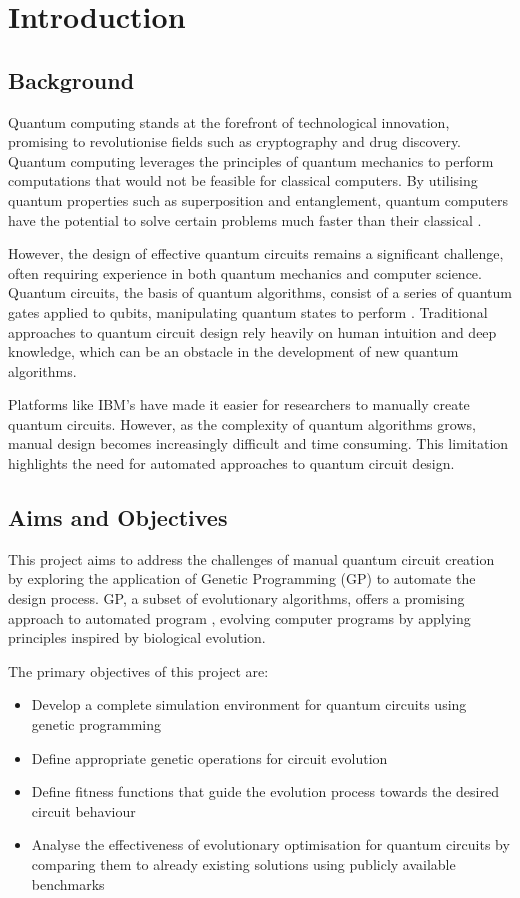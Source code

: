 \chapter{Introduction}
\section{Background}

Quantum computing stands at the forefront of technological innovation, promising to revolutionise fields such as cryptography and drug discovery. Quantum computing leverages the principles of quantum mechanics to perform computations that would not be feasible for classical computers. By utilising quantum properties such as superposition and entanglement, quantum computers have the potential to solve certain problems much faster than their classical .

However, the design of effective quantum circuits remains a significant challenge, often requiring experience in both quantum mechanics and computer science. Quantum circuits, the basis of quantum algorithms, consist of a series of quantum gates applied to qubits, manipulating quantum states to perform . Traditional approaches to quantum circuit design rely heavily on human intuition and deep knowledge, which can be an obstacle in the development of new quantum algorithms.

Platforms like IBM's  have made it easier for researchers to manually create quantum circuits. However, as the complexity of quantum algorithms grows, manual design becomes increasingly difficult and time consuming. This limitation highlights the need for automated approaches to quantum circuit design.

\section{Aims and Objectives}

This project aims to address the challenges of manual quantum circuit creation by exploring the application of Genetic Programming (GP) to automate the design process. GP, a subset of evolutionary algorithms, offers a promising approach to automated program , evolving computer programs by applying principles inspired by biological evolution.

The primary objectives of this project are:
\begin{itemize}
    \item Develop a complete simulation environment for quantum circuits using genetic programming
    \item Define appropriate genetic operations for circuit evolution
    \item Define fitness functions that guide the evolution process towards the desired circuit behaviour
    \item Analyse the effectiveness of evolutionary optimisation for quantum circuits by comparing them to already existing solutions using publicly available benchmarks
\end{itemize}

